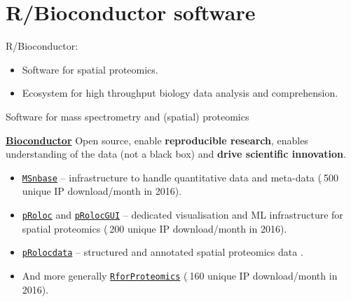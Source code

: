 \section{R/Bioconductor software}

\begin{frame}{}

  R/Bioconductor:
  \begin{itemize}
  \item Software for spatial proteomics.
  \item Ecosystem for high throughput biology data analysis and
    comprehension.
  \end{itemize}
  
\end{frame}

\begin{frame}{Software for mass spectrometry and (spatial) proteomics}
  \begin{block}{}
    \href{http://bioconductor.org/}{\textbf{Bioconductor}} Open
    source, enable \textbf{reproducible research}, enables
    understanding of the data (not a black box) and \textbf{drive
      scientific innovation}.

    \begin{small}
      \begin{itemize}
      \item
        \href{http://bioconductor.org/packages/release/bioc/html/MSnbase.html}{\texttt{MSnbase}}
        -- infrastructure to handle quantitative data and meta-data
        \citep{Gatto:2012} ($_{\widetilde{~}}$500 unique IP download/month in 2016).
      \item
        \href{http://bioconductor.org/packages/release/bioc/html/pRoloc.html}{\texttt{pRoloc}}
        and
        \href{http://bioconductor.org/packages/release/bioc/html/pRolocGUI.html}{\texttt{pRolocGUI}}
        -- dedicated visualisation and ML infrastructure for spatial
        proteomics \citep{Gatto:2014} ($_{\widetilde{~}}$200 unique IP
        download/month in 2016).
      \item
        \href{http://bioconductor.org/packages/release/data/experiment/html/pRolocdata.html}{\texttt{pRolocdata}}
        -- structured and annotated spatial proteomics data
        \citep{Gatto:2014}.
      \item And more generally
        \href{http://www.bioconductor.org/packages/release/data/experiment/html/RforProteomics.html}{\texttt{RforProteomics}}
        \citep{Gatto:2014b} ($_{\widetilde{~}}$160 unique IP
        download/month in 2016).
      \end{itemize}
    \end{small}
  \end{block}   
\end{frame}



